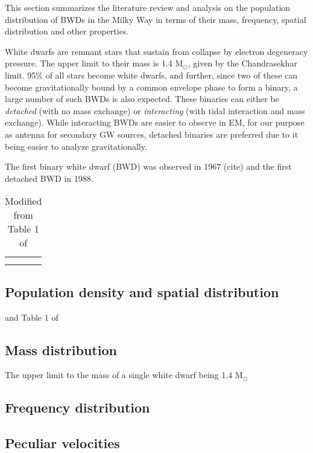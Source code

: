 This section summarizes the literature review and analysis on the population distribution of BWDs in the Milky Way in terms of their mass, frequency, spatial distribution and other properties.

White dwarfs are remnant stars that sustain from collapse by electron degeneracy pressure. The upper limit to their mass is 1.4 M$_\odot$, given by the Chandrasekhar limit. 95\% of all stars become white dwarfs, and further, since two of these can become gravitationally bound by a common envelope phase to form a binary, a large number of such BWDs is also expected. These binaries can either be \textit{detached} (with no mass exchange) or \textit{interacting} (with tidal interaction and mass exchange). While interacting BWDs are easier to observe in EM, for our purpose as antenna for secondary GW sources, detached binaries are preferred due to it being easier to analyze gravitationally.

The first binary white dwarf (BWD) was observed in 1967 (cite) and the first detached BWD in 1988.

\begin{table}[h]
    \centering
    \begin{tabular}{c|c}
         &  \\
         & 
    \end{tabular}
    \caption{Modified from Table 1 of \cite{Lamberts2019}}
    \label{tab:lamberts}
\end{table}

\subsection{Population density and spatial distribution}
and Table 1 of \cite{Lamberts2019} 

\subsection{Mass distribution}
The upper limit to the mass of a single white dwarf being 1.4 M$_\odot$ 


\subsection{Frequency distribution}

\subsection{Peculiar velocities}